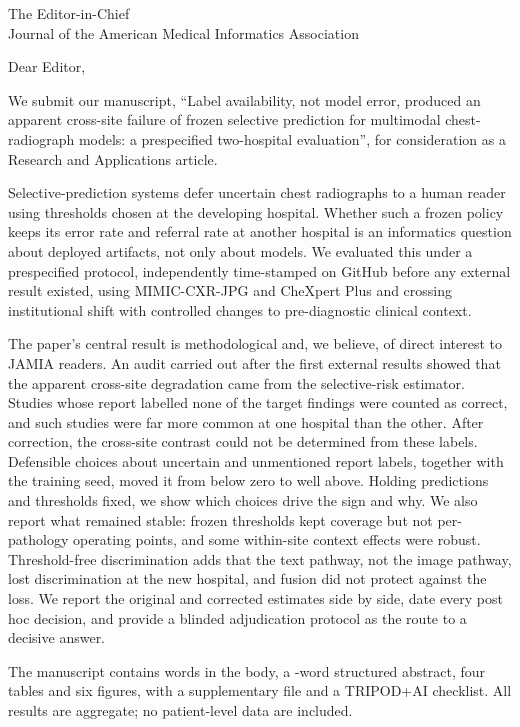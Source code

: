 \documentclass[11pt,a4paper]{letter}
\begin{document}
\begin{letter}{The Editor-in-Chief\\ Journal of the American Medical Informatics Association}
\opening{Dear Editor,}

We submit our manuscript, ``Label availability, not model error, produced an
apparent cross-site failure of frozen selective prediction for multimodal
chest-radiograph models: a prespecified two-hospital evaluation'', for
consideration as a Research and Applications article.

Selective-prediction systems defer uncertain chest radiographs to a human
reader using thresholds chosen at the developing hospital. Whether such a
frozen policy keeps its error rate and referral rate at another hospital is an
informatics question about deployed artifacts, not only about models. We
evaluated this under a prespecified protocol, independently time-stamped on
GitHub before any external result existed, using
MIMIC-CXR-JPG and CheXpert Plus and crossing institutional shift with
controlled changes to pre-diagnostic clinical context.

The paper's central result is methodological and, we believe, of direct
interest to JAMIA readers. An audit carried out after the first external
results showed that the apparent cross-site degradation came from the
selective-risk estimator. Studies whose report labelled none of the target
findings were counted as correct, and such studies were far more common at one
hospital than the other. After correction, the cross-site contrast could not be
determined from these labels. Defensible choices about uncertain and unmentioned report labels,
together with the training seed, moved it from below zero to well above.
Holding predictions and thresholds fixed, we show which choices drive the sign
and why. We also report what remained stable: frozen thresholds kept coverage
but not per-pathology operating points, and some within-site context effects
were robust. Threshold-free discrimination adds that the text pathway, not the
image pathway, lost discrimination at the new hospital, and fusion did not
protect against the loss. We report the original and corrected estimates side by side, date
every post hoc decision, and provide a blinded adjudication protocol as the
route to a decisive answer.

The manuscript contains \unskip{} words in the body, a
\unskip-word structured abstract, four tables and six figures, with a supplementary file and a
TRIPOD+AI checklist. All results are aggregate; no patient-level data are
included.


\end{letter}
\end{document}

